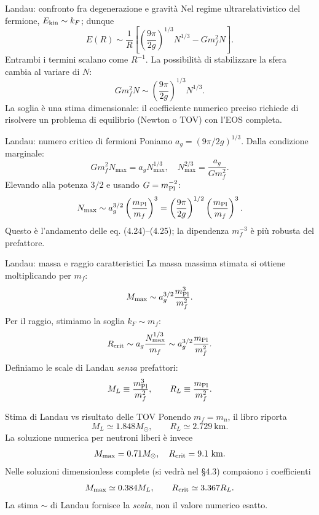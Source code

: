 \begin{frame}[t]{Landau: confronto fra degenerazione e gravità}
\small
Nel regime ultrarelativistico del fermione, $E_{\rm kin}\sim k_F$; dunque
\[
E(R)\sim\frac1R\left[
\left(\frac{9\pi}{2g}\right)^{1/3}N^{1/3}
-Gm_f^2N\right].
\]
Entrambi i termini scalano come $R^{-1}$. La possibilità di stabilizzare la sfera cambia al variare di $N$:
\[
Gm_f^2N\sim\left(\frac{9\pi}{2g}\right)^{1/3}N^{1/3}.
\]
La soglia è una stima dimensionale: il coefficiente numerico preciso richiede di risolvere un problema di equilibrio (Newton o TOV) con l'EOS completa.
\end{frame}

\begin{frame}[t]{Landau: numero critico di fermioni}
\small
Poniamo $a_g=(9\pi/2g)^{1/3}$. Dalla condizione marginale:
\[
Gm_f^2N_{\max}=a_gN_{\max}^{1/3},
\quad N_{\max}^{2/3}=\frac{a_g}{Gm_f^2}.
\]
Elevando alla potenza $3/2$ e usando $G=m_{\rm Pl}^{-2}$:
\[
N_{\max}\sim a_g^{3/2}
\left(\frac{m_{\rm Pl}}{m_f}\right)^3
=\left(\frac{9\pi}{2g}\right)^{1/2}
\left(\frac{m_{\rm Pl}}{m_f}\right)^3.
\]
Questo è l'andamento delle eq. (4.24)--(4.25); la dipendenza $m_f^{-3}$ è più robusta del prefattore.
\end{frame}

\begin{frame}[t]{Landau: massa e raggio caratteristici}
\small
La massa massima stimata si ottiene moltiplicando per $m_f$:
\[
M_{\max}\sim a_g^{3/2}\frac{m_{\rm Pl}^3}{m_f^2}.
\]
Per il raggio, stimiamo la soglia $k_F\sim m_f$:
\[
R_{\rm crit}\sim a_g\frac{N_{\max}^{1/3}}{m_f}
\sim a_g^{3/2}\frac{m_{\rm Pl}}{m_f^2}.
\]
Definiamo le scale di Landau \emph{senza} prefattori:
\[
M_L\equiv\frac{m_{\rm Pl}^3}{m_f^2},\qquad
R_L\equiv\frac{m_{\rm Pl}}{m_f^2}.
\]
\end{frame}

\begin{frame}[t]{Stima di Landau vs risultato delle TOV}
\small
Ponendo $m_f=m_n$, il libro riporta
\[
M_L\simeq1.848M_\odot,\qquad R_L\simeq2.729\ \mathrm{km}.
\]
La soluzione numerica per neutroni liberi è invece
\[
M_{\max}=0.71M_\odot,\quad R_{\rm crit}=9.1\ \mathrm{km}.
\]
Nelle soluzioni dimensionless complete (si vedrà nel §4.3) compaiono i coefficienti
\[
M_{\max}\simeq0.384M_L,\qquad R_{\rm crit}\simeq3.367R_L.
\]
La stima $\sim$ di Landau fornisce la \emph{scala}, non il valore numerico esatto.
\end{frame}

